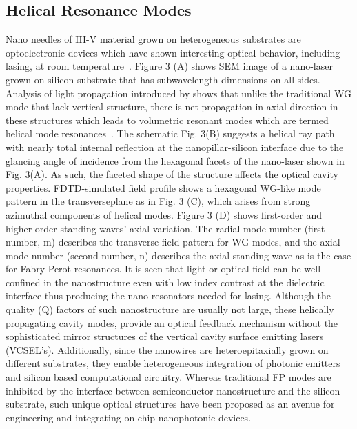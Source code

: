 \subsection{Helical Resonance Modes}
Nano needles of III-V material grown on heterogeneous substrates are
optoelectronic devices which have shown interesting optical behavior, including
lasing, at room temperature~\cite{Chen:2011cg}. Figure 3 (A) shows SEM image of a nano-laser
grown on silicon substrate that has subwavelength dimensions on all sides.
Analysis of light propagation introduced by shows that unlike the traditional
WG mode that lack vertical structure, there is net propagation in axial
direction in these structures which leads to  volumetric resonant modes which
are termed helical mode resonances~\cite{Chen:2011cg}. The schematic Fig. 3(B) suggests a
helical ray path with nearly total internal reflection at the
nanopillar-silicon interface due to the glancing angle of incidence from the
hexagonal facets of the nano-laser shown in Fig. 3(A). As such, the faceted
shape of the structure affects the optical cavity properties. FDTD-simulated
field profile shows a hexagonal WG-like mode pattern  in the transverseplane as
in Fig. 3 (C), which arises from strong azimuthal components of helical modes.
Figure 3 (D) shows first-order  and higher-order standing waves’ axial
variation. The radial mode number (first number, m) describes the transverse
field pattern for WG modes, and the axial mode number (second number, n)
describes the axial standing wave as is the case for Fabry-Perot resonances. It
is seen that light or optical field can be well confined in the nanostructure
even with low index contrast at the dielectric interface thus producing the
nano-resonators needed for lasing. Although the quality (Q) factors of such
nanostructure are usually not large, these helically propagating cavity modes,
provide an optical feedback mechanism without the sophisticated mirror
structures of the vertical cavity surface emitting lasers (VCSEL’s).
Additionally, since the nanowires are heteroepitaxially grown on different
substrates, they enable heterogeneous integration of photonic emitters and
silicon based computational circuitry.  Whereas traditional FP modes are
inhibited by the interface between semiconductor nanostructure and the silicon
substrate, such unique optical structures have been proposed as an avenue for
engineering and integrating on-chip nanophotonic devices. 

